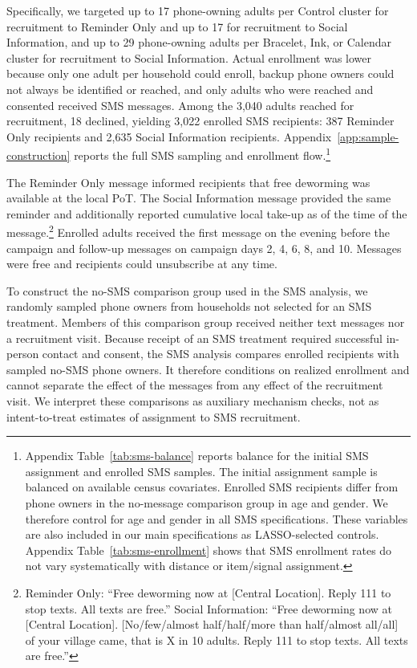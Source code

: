 \documentclass[ECM\space ReStud.tex]{subfiles}
\begin{document}
Specifically, we targeted up to 17 phone-owning adults per Control cluster for recruitment to Reminder Only and up to 17 for recruitment to Social Information, and up to 29 phone-owning adults per Bracelet, Ink, or Calendar cluster for recruitment to Social Information. Actual enrollment was lower because only one adult per household could enroll, backup phone owners could not always be identified or reached, and only adults who were reached and consented received SMS messages. Among the 3{,}040 adults reached for recruitment, 18 declined, yielding 3{,}022 enrolled SMS recipients: 387 Reminder Only recipients and 2{,}635 Social Information recipients. Appendix~\ref{app:sample-construction} reports the full SMS sampling and enrollment flow.\footnote{Appendix Table~\ref{tab:sms-balance} reports balance for the initial SMS assignment and enrolled SMS samples. The initial assignment sample is balanced on available census covariates. Enrolled SMS recipients differ from phone owners in the no-message comparison group in age and gender. We therefore control for age and gender in all SMS specifications. These variables are also included in our main specifications as LASSO-selected controls. Appendix Table~\ref{tab:sms-enrollment} shows that SMS enrollment rates do not vary systematically with distance or item/signal assignment.}

The Reminder Only message informed recipients that free deworming was available at the local PoT. The Social Information message provided the same reminder and additionally reported cumulative local take-up as of the time of the message.\footnote{Reminder Only: ``Free deworming now at [Central Location]. Reply 111 to stop texts. All texts are free.'' Social Information: ``Free deworming now at [Central Location]. [No/few/almost half/half/more than half/almost all/all] of your village came, that is X in 10 adults. Reply 111 to stop texts. All texts are free.''} Enrolled adults received the first message on the evening before the campaign and follow-up messages on campaign days 2, 4, 6, 8, and 10. Messages were free and recipients could unsubscribe at any time.

To construct the no-SMS comparison group used in the SMS analysis, we randomly sampled phone owners from households not selected for an SMS treatment. Members of this comparison group received neither text messages nor a recruitment visit. Because receipt of an SMS treatment required successful in-person contact and consent, the SMS analysis compares enrolled recipients with sampled no-SMS phone owners. It therefore conditions on realized enrollment and cannot separate the effect of the messages from any effect of the recruitment visit. We interpret these comparisons as auxiliary mechanism checks, not as intent-to-treat estimates of assignment to SMS recruitment.
\end{document}
